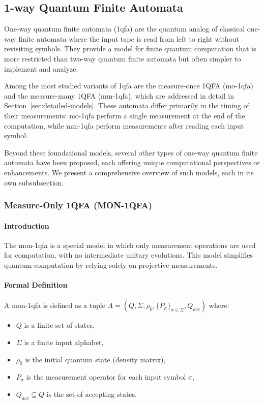 \subsection{1-way Quantum Finite Automata}
\label{sec:1-way-qfa}

One-way quantum finite automata (\gls{1qfa}) are the quantum analog of classical one-way finite automata where the input tape is read from left to right without revisiting symbols. They provide a model for finite quantum computation that is more restricted than two-way quantum finite automata but often simpler to implement and analyze.

Among the most studied variants of \gls{1qfa} are the measure-once 1QFA (\gls{mo-1qfa}) and the measure-many 1QFA (\gls{mm-1qfa}), which are addressed in detail in Section~\ref{sec:detailed-models}. These automata differ primarily in the timing of their measurements: \gls{mo-1qfa} perform a single measurement at the end of the computation, while \gls{mm-1qfa} perform measurements after reading each input symbol.

Beyond these foundational models, several other types of one-way quantum finite automata have been proposed, each offering unique computational perspectives or enhancements. We present a comprehensive overview of such models, each in its own subsubsection.

\subsubsection{Measure-Only 1QFA (MON-1QFA)}
\paragraph{Introduction}
The \gls{mon-1qfa} is a special model in which only measurement operations are used for computation, with no intermediate unitary evolutions. This model simplifies quantum computation by relying solely on projective measurements.

\paragraph{Formal Definition}
A \gls{mon-1qfa} is defined as a tuple \( A = (Q, \Sigma, \rho_0, \{P_{\sigma}\}_{\sigma \in \Sigma}, Q_{acc}) \) where:
\begin{itemize}
    \item \( Q \) is a finite set of states,
    \item \( \Sigma \) is a finite input alphabet,
    \item \( \rho_0 \) is the initial quantum state (density matrix),
    \item \( P_{\sigma} \) is the measurement operator for each input symbol \( \sigma \),
    \item \( Q_{acc} \subseteq Q \) is the set of accepting states.
\end{itemize}

